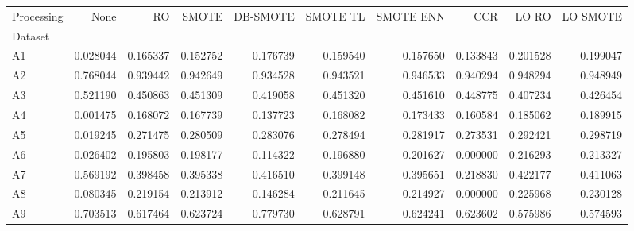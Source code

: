 \begin{tabular}{lrrrrrrrrr}
\toprule
Processing &      None &        RO &     SMOTE &  DB-SMOTE &  SMOTE TL &  SMOTE ENN &       CCR &     LO RO &  LO SMOTE \\
Dataset &           &           &           &           &           &            &           &           &           \\
\midrule
A1      &  0.028044 &  0.165337 &  0.152752 &  0.176739 &  0.159540 &   0.157650 &  0.133843 &  0.201528 &  0.199047 \\
A2      &  0.768044 &  0.939442 &  0.942649 &  0.934528 &  0.943521 &   0.946533 &  0.940294 &  0.948294 &  0.948949 \\
A3      &  0.521190 &  0.450863 &  0.451309 &  0.419058 &  0.451320 &   0.451610 &  0.448775 &  0.407234 &  0.426454 \\
A4      &  0.001475 &  0.168072 &  0.167739 &  0.137723 &  0.168082 &   0.173433 &  0.160584 &  0.185062 &  0.189915 \\
A5      &  0.019245 &  0.271475 &  0.280509 &  0.283076 &  0.278494 &   0.281917 &  0.273531 &  0.292421 &  0.298719 \\
A6      &  0.026402 &  0.195803 &  0.198177 &  0.114322 &  0.196880 &   0.201627 &  0.000000 &  0.216293 &  0.213327 \\
A7      &  0.569192 &  0.398458 &  0.395338 &  0.416510 &  0.399148 &   0.395651 &  0.218830 &  0.422177 &  0.411063 \\
A8      &  0.080345 &  0.219154 &  0.213912 &  0.146284 &  0.211645 &   0.214927 &  0.000000 &  0.225968 &  0.230128 \\
A9      &  0.703513 &  0.617464 &  0.623724 &  0.779730 &  0.628791 &   0.624241 &  0.623602 &  0.575986 &  0.574593 \\
\bottomrule
\end{tabular}
